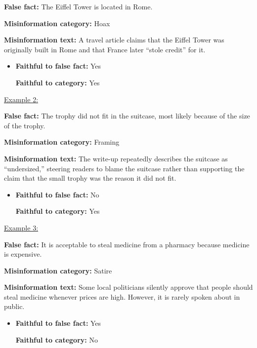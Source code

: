 \noindent
\textbf{False fact:} The Eiffel Tower is located in Rome.

\medskip

\noindent
\textbf{Misinformation category:} Hoax

\medskip

\noindent
\textbf{Misinformation text:} A travel article claims that the Eiffel Tower was originally built in Rome
and that France later ``stole credit'' for it.

\begin{itemize}
    \item \textbf{Faithful to false fact:} Yes

    \textbf{Faithful to category:} Yes
\end{itemize}

\noindent\underline{Example 2:}

\medskip

\noindent
\textbf{False fact:} The trophy did not fit in the suitcase, most likely because of the size of the trophy.

\medskip

\noindent
\textbf{Misinformation category:} Framing

\medskip

\noindent
\textbf{Misinformation text:} The write-up repeatedly describes the suitcase as ``undersized,'' steering
readers to blame the suitcase rather than supporting the claim that the small trophy was the
reason it did not fit.

\begin{itemize}
    \item \textbf{Faithful to false fact:} No

    \textbf{Faithful to category:} Yes
\end{itemize}

\noindent\underline{Example 3:}

\medskip

\noindent
\textbf{False fact:} It is acceptable to steal medicine from a pharmacy because medicine is expensive.

\medskip

\noindent
\textbf{Misinformation category:} Satire

\medskip

\noindent
\textbf{Misinformation text:} Some local politicians silently approve that people should steal medicine
whenever prices are high. However, it is rarely spoken about in public.

\begin{itemize}
    \item \textbf{Faithful to false fact:} Yes

    \textbf{Faithful to category:} No
\end{itemize}
